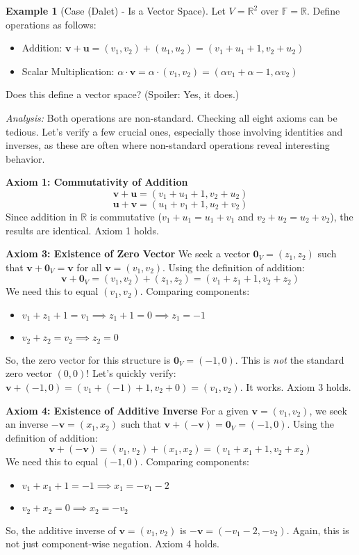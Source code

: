 \documentclass[11pt]{article}
\theoremstyle{definition}
\newtheorem{example}[theorem]{Example}
\theoremstyle{remark}
\newcommand{\field}[1]{\mathbb{#1}} %
\newcommand{\R}{\field{R}}
\newcommand{\F}{\field{F}} %
\newcommand{\veca}[1]{\mathbf{#1}} %
\begin{document}
\begin{example}[Case (Dalet) - Is a Vector Space] \label{ex:vs_pass}
Let $V = \R^2$ over $\F = \R$. Define operations as follows:
\begin{itemize}
    \item Addition: $\veca{v} + \veca{u} = (v_1, v_2) + (u_1, u_2) = (v_1+u_1+1, v_2+u_2)$
    \item Scalar Multiplication: $\alpha \cdot \veca{v} = \alpha \cdot (v_1, v_2) = (\alpha v_1 + \alpha - 1, \alpha v_2)$
\end{itemize}
Does this define a vector space? (Spoiler: Yes, it does.)

\textit{Analysis:} Both operations are non-standard. Checking all eight axioms can be tedious. Let's verify a few crucial ones, especially those involving identities and inverses, as these are often where non-standard operations reveal interesting behavior.

\textbf{Axiom 1: Commutativity of Addition}
\[ \veca{v} + \veca{u} = (v_1+u_1+1, v_2+u_2) \]
\[ \veca{u} + \veca{v} = (u_1+v_1+1, u_2+v_2) \]
Since addition in $\R$ is commutative ($v_1+u_1 = u_1+v_1$ and $v_2+u_2 = u_2+v_2$), the results are identical. Axiom 1 holds.

\textbf{Axiom 3: Existence of Zero Vector}
We seek a vector $\veca{0}_V = (z_1, z_2)$ such that $\veca{v} + \veca{0}_V = \veca{v}$ for all $\veca{v}=(v_1, v_2)$.
Using the definition of addition:
\[ \veca{v} + \veca{0}_V = (v_1, v_2) + (z_1, z_2) = (v_1+z_1+1, v_2+z_2) \]
We need this to equal $(v_1, v_2)$. Comparing components:
\begin{itemize}
    \item $v_1+z_1+1 = v_1 \implies z_1+1 = 0 \implies z_1 = -1$
    \item $v_2+z_2 = v_2 \implies z_2 = 0$
\end{itemize}
So, the zero vector for this structure is $\veca{0}_V = (-1, 0)$. This is \emph{not} the standard zero vector $(0,0)$! Let's quickly verify:
$\veca{v} + (-1, 0) = (v_1 + (-1) + 1, v_2 + 0) = (v_1, v_2)$. It works. Axiom 3 holds.

\textbf{Axiom 4: Existence of Additive Inverse}
For a given $\veca{v}=(v_1, v_2)$, we seek an inverse $-\veca{v} = (x_1, x_2)$ such that $\veca{v} + (-\veca{v}) = \veca{0}_V = (-1, 0)$.
Using the definition of addition:
\[ \veca{v} + (-\veca{v}) = (v_1, v_2) + (x_1, x_2) = (v_1+x_1+1, v_2+x_2) \]
We need this to equal $(-1, 0)$. Comparing components:
\begin{itemize}
    \item $v_1+x_1+1 = -1 \implies x_1 = -v_1 - 2$
    \item $v_2+x_2 = 0 \implies x_2 = -v_2$
\end{itemize}
So, the additive inverse of $\veca{v}=(v_1, v_2)$ is $-\veca{v} = (-v_1-2, -v_2)$. Again, this is not just component-wise negation. Axiom 4 holds.


\end{example}
\end{document}
